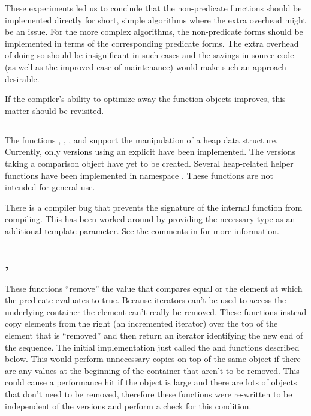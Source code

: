 These experiments led us to conclude that the non-predicate functions should
be implemented directly for short, simple algorithms where the extra overhead
might be an issue. For the more complex algorithms, the non-predicate forms
should be implemented in terms of the corresponding predicate forms. The extra
overhead of doing so should be insignificant in such cases and the savings in
source code (as well as the improved ease of maintenance) would make such an
approach desirable.

If the compiler's ability to optimize away the function objects improves, this
matter should be revisited.

\subsection[\texttt{*\_heap}]{}

The functions , , , and
 support the manipulation of a heap data structure. Currently,
only versions using an explicit  have been implemented. The
versions taking a comparison object have yet to be created. Several
heap-related helper functions have been implemented in namespace
. These functions are not intended for general use.

There is a compiler bug that prevents the signature of the internal
 function from compiling. This has been worked around by
providing the necessary type as an additional template parameter. See the
comments in  for more information.

\subsection[\texttt{remove}, \texttt{remove\_if}]{, }

These functions ``remove'' the value that compares equal or the element at
which the predicate evaluates to true. Because iterators can't be used to
access the underlying container the element can't really be removed. These
functions instead copy elements from the right (an incremented iterator) over
the top of the element that is ``removed'' and then return an iterator
identifying the new end of the sequence. The initial implementation just
called the  and  functions described
below. This would perform unnecessary copies on top of the same object if
there are any values at the beginning of the container that aren't to be
removed. This could cause a performance hit if the object is large and there
are lots of objects that don't need to be removed, therefore these functions
were re-written to be independent of the  versions and perform a
check for this condition.


